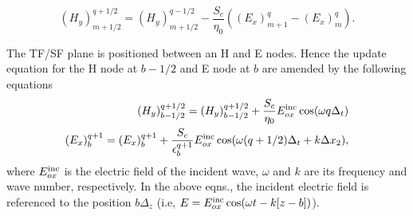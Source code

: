\documentclass[journal]{IEEEtran}
\begin{document}
\begin{equation*}
\label{eq:updateH}
\left(H_y\right)^{q+1/2}_{m+1/2}=\left(H_y\right)^{q-1/2}_{m+1/2}-\frac{S_c}{\eta_0}\left(\left(E_x\right)^{q}_{m+1}-\left(E_x\right)^q_m\right).
\end{equation*}

The TF/SF plane is positioned between an H and E nodes. Hence the update equation for the H node at $b-1/2$ and E node at $b$ are amended by the following equations\cite{Schneider_Online}
\begin{eqnarray*}
\left(H_y\right)^{q+1/2}_{b-1/2}=\left(H_y\right)^{q+1/2}_{b-1/2}+\frac{S_c}{\eta_0}E_{ox}^\textnormal{inc}\cos(\omega q\Delta_t)\\
\left(E_x\right)^{q+1}_b=\left(E_x\right)^{q+1}_b+\frac{S_c}{\epsilon^{q+1}_b}E_{ox}^\textnormal{inc}\cos(\omega(q+1/2)\Delta_t+k\Delta x_2),
\end{eqnarray*}
where $E_{ox}^\textnormal{inc}$ is the electric field of the incident wave, $\omega$ and $k$ are its frequency and wave number, respectively. In the above eqns., the incident electric field is referenced to the position $b\Delta_z$ (i.e, $E=E_{ox}^\textnormal{inc}\cos(\omega t-k[z-b])$).

%


\end{document}
